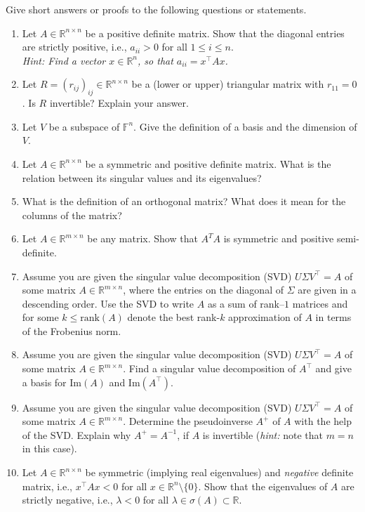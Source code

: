 Give short answers or proofs to the following questions or statements.
\begin{enumerate}
	\item  Let $A \in \mathbb{R}^{n \times n}$ be a positive definite matrix. Show that the diagonal entries are strictly positive, i.e.,  $a_{ii} > 0$ for all $1\leq i\leq n$.\\
	\textit{Hint: Find a vector $x\in\mathbb{R}^{n}$, so that $a_{ii}=x^\top A x$.}
	\item Let $R=(r_{ij})_{ij} \in \mathbb{R}^{n \times n}$ be a (lower or upper) triangular matrix with $r_{11} = 0$. Is $R$ invertible? Explain your answer.	
	\item Let $V$ be a subspace  of $\mathbb{F}^n$. Give the definition of a basis and the dimension of $V$.		
	\item Let $A \in \mathbb{R}^{n \times n}$ be a symmetric and positive definite matrix. What is the relation between its singular values and its eigenvalues?
	\item What is the definition of an orthogonal matrix? What does it mean for the columns of the matrix?
	\item Let $A \in  \mathbb{R}^{m \times n}$ be any matrix. Show that $A^TA$ is symmetric and positive semi-definite.
	\item Assume you are given the singular value decomposition (SVD)
$U \Sigma V^\top = A$ of some matrix $A \in \mathbb{R}^{m \times n}$, where the 
entries on the diagonal of $\Sigma$ are given in a descending order. Use the SVD to write $A$ as a sum of rank--$1$ matrices and for some $k \leq \text{rank}(A)$ denote the best rank-$k$ approximation of $A$ in terms of the Frobenius norm.
	\item Assume you are given the singular value decomposition (SVD) $U \Sigma V^\top = A$ of some matrix $A \in \mathbb{R}^{m \times n}$. Find a singular value decomposition of $A^\top$ and give a basis for $\text{Im}(A)$ and $\text{Im}(A^\top)$.
		\item Assume you are given the singular value decomposition (SVD)
	$U \Sigma V^\top = A$ of some matrix $A \in \mathbb{R}^{m \times n}$. Determine the pseudoinverse $A^+$ of $A$ with the help of the SVD. Explain why $A^+ = A^{-1}$, if $A$ is invertible (\textit{hint:} note that $m=n$ in this case).
	\item Let $A \in \mathbb{R}^{n \times n}$ be symmetric (implying real eigenvalues) and \textit{negative} definite matrix, i.e., $x^\top A x < 0$ for all $x \in \mathbb{R}^{n}\setminus \{0\}$. Show that the eigenvalues of $A$ are strictly negative, i.e., $\lambda < 0 $ for all $\lambda \in \sigma(A) \subset \mathbb{R}$.

\end{enumerate}
